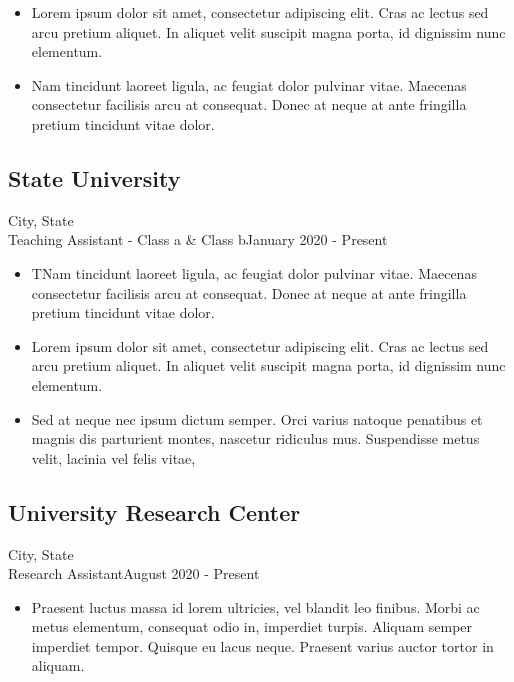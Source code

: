 \documentclass{article}
\begin{document}
\begin{itemize}[leftmargin=*]
\item Lorem ipsum dolor sit amet, consectetur adipiscing elit. Cras ac lectus sed arcu pretium aliquet. In aliquet velit suscipit magna porta, id dignissim nunc elementum.
\item Nam tincidunt laoreet ligula, ac feugiat dolor pulvinar vitae. Maecenas consectetur facilisis arcu at consequat. Donec at neque at ante fringilla pretium tincidunt vitae dolor.
\end{itemize}

\subsection{State University}
\hfill City, State
\\
Teaching Assistant - Class a \& Class b\hfill January 2020 - Present

\begin{itemize}[leftmargin=*]
\item TNam tincidunt laoreet ligula, ac feugiat dolor pulvinar vitae. Maecenas consectetur facilisis arcu at consequat. Donec at neque at ante fringilla pretium tincidunt vitae dolor.
\item Lorem ipsum dolor sit amet, consectetur adipiscing elit. Cras ac lectus sed arcu pretium aliquet. In aliquet velit suscipit magna porta, id dignissim nunc elementum. 
\item Sed at neque nec ipsum dictum semper. Orci varius natoque penatibus et magnis dis parturient montes, nascetur ridiculus mus. Suspendisse metus velit, lacinia vel felis vitae, 
\end{itemize}

\subsection{University Research Center}
\hfill City, State
\ \\
Research Assistant\hfill August 2020 - Present

\begin{itemize}[leftmargin=*]

\item Praesent luctus massa id lorem ultricies, vel blandit leo finibus. Morbi ac metus elementum, consequat odio in, imperdiet turpis. Aliquam semper imperdiet tempor. Quisque eu lacus neque. Praesent varius auctor tortor in aliquam.

\end{itemize}
\end{document}
